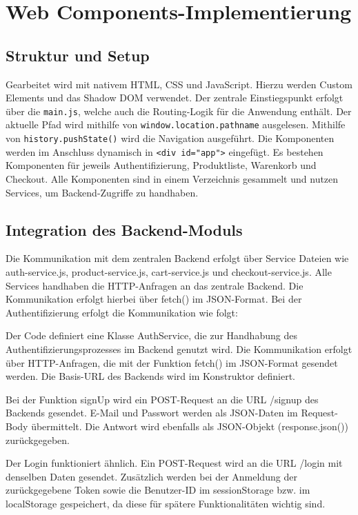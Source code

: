 \documentclass[oneside]{ausarbeitung}
\begin{document}
\section{Web Components-Implementierung}

\subsection{Struktur und Setup}

Gearbeitet wird mit nativem HTML, CSS und JavaScript. Hierzu werden Custom Elements und das Shadow DOM verwendet. Der zentrale Einstiegspunkt erfolgt über die \texttt{main.js}, welche auch die Routing-Logik für die Anwendung enthält. Der aktuelle Pfad wird mithilfe von \texttt{window.location.pathname} ausgelesen. Mithilfe von \texttt{history.pushState()} wird die Navigation ausgeführt. Die Komponenten werden im Anschluss dynamisch in \texttt{<div id="app">} eingefügt. Es bestehen Komponenten für jeweils Authentifizierung, Produktliste, Warenkorb und Checkout. Alle Komponenten sind in einem Verzeichnis gesammelt und nutzen Services, um Backend-Zugriffe zu handhaben.

\subsection{Integration des Backend-Moduls}

Die Kommunikation mit dem zentralen Backend erfolgt über Service Dateien wie auth-service.js, product-service.js, cart-service.js und checkout-service.js. 
Alle Services handhaben die HTTP-Anfragen an das zentrale Backend. Die Kommunikation erfolgt hierbei über fetch() im JSON-Format. 
Bei der Authentifizierung erfolgt die Kommunikation wie folgt: 

Der Code definiert eine Klasse AuthService, die zur Handhabung des Authentifizierungsprozesses im Backend genutzt wird. Die Kommunikation erfolgt über HTTP-Anfragen, die mit der Funktion fetch() im JSON-Format gesendet werden. Die Basis-URL des Backends wird im Konstruktor definiert. 

Bei der Funktion signUp wird ein POST-Request an die URL /signup des Backends gesendet. E-Mail und Passwort werden als JSON-Daten im Request-Body übermittelt. Die Antwort wird ebenfalls als JSON-Objekt (response.json()) zurückgegeben. 

Der Login funktioniert ähnlich. Ein POST-Request wird an die URL /login mit denselben Daten gesendet. Zusätzlich werden bei der Anmeldung der zurückgegebene Token sowie die Benutzer-ID im sessionStorage bzw. im localStorage gespeichert, da diese für spätere Funktionalitäten wichtig sind.
\end{document}
